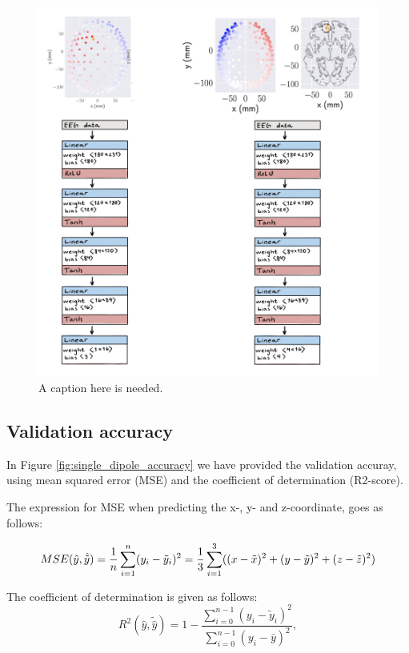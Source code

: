 \documentclass[a4paper, UKenglish, 11pt]{uiomaster}
\begin{document}
\begin{figure}
  \includegraphics[width=\linewidth]{figures/NN_architecture.png}
  \caption{A caption here is needed.}
  \label{fig:NN_architecture.png}
\end{figure}

\subsection{Validation accuracy}
In Figure \ref{fig:single_dipole_accuracy} we have provided the validation accuray, using mean squared error (MSE) and the coefficient of determination (R2-score).

The expression for MSE when predicting the x-, y- and z-coordinate, goes as follows:

\begin{equation}
MSE(\hat{y},\hat{\tilde{y}}) = \frac{1}{n}
\sum_{i=1}^{n}(y_i-\tilde{y}_i)^2 \\
= \frac{1}{3}\sum_{i=1}^{3}((x-\tilde{x})^2 + (y-\tilde{y})^2 + (z-\tilde{z})^2 )
\label{eq:MSE}
\end{equation}

The coefficient of determination is given as follows:
\begin{equation}
R^2(\hat{y}, \tilde{\hat{y}}) = 1 - \frac{\sum_{i=0}^{n - 1} (y_i - \tilde{y}_i)^2}{\sum_{i=0}^{n - 1} (y_i - \bar{y})^2},
\label{eq:R2}
\end{equation}
\end{document}
